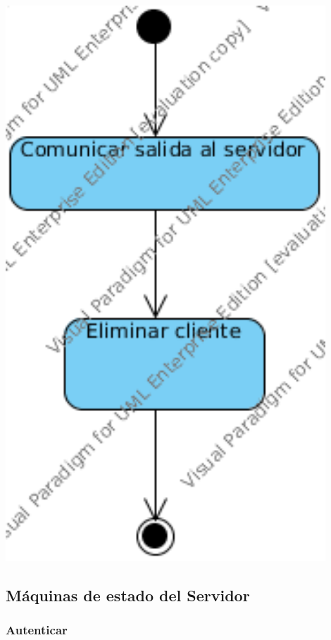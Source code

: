 \documentclass[a4paper,11pt,oneside]{article}
\begin{document}
\includegraphics[width=0.9\textwidth]{img/ms_SalirPartidaCliente.png}\\[1cm]


\subsection{Máquinas de estado del Servidor}

\subsubsection{Autenticar}
\end{document}
